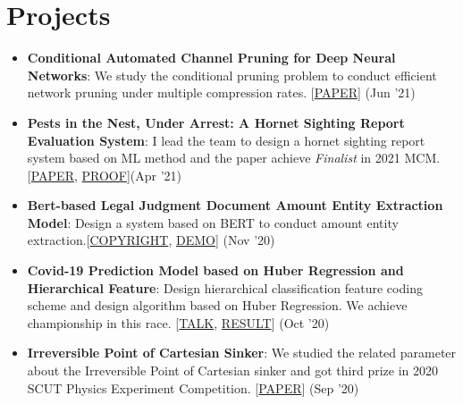 \documentclass[a4paper,20pt]{article}
\newcommand{\resumeItem}[2]{
  \item\small{
    \textbf{#1}{: #2 \vspace{-2pt}}
  }
}
\newcommand{\resumeSubItem}[2]{\resumeItem{#1}{#2}\vspace{-3pt}}
\newcommand{\resumeSubHeadingListStart}{\begin{itemize}[leftmargin=*]}
\newcommand{\resumeSubHeadingListEnd}{\end{itemize}}
\begin{document}
\section{Projects}
\resumeSubHeadingListStart
\resumeSubItem{Conditional Automated Channel Pruning for Deep Neural Networks}{We study the conditional pruning problem to conduct efficient network pruning under multiple compression rates. [\href{https://ieeexplore.ieee.org/document/9453104}{PAPER}] (Jun '21)}
\resumeSubItem{Pests in the Nest, Under Arrest:
A Hornet Sighting Report Evaluation System}{I lead the team to design a hornet sighting report system based on ML method and the paper achieve \textit{Finalist} in 2021 MCM. [\href{https://www.csyixinliu.com/project/2021mcm/finalist_paper.pdf}{PAPER}, \href{https://www.csyixinliu.com/materials/2021mcm_f.pdf}{PROOF}](Apr '21)}
\vspace{2pt}
\resumeSubItem{Bert-based Legal Judgment Document Amount Entity Extraction Model}{Design a system based on BERT to conduct amount entity extraction.[\href{https://www.csyixinliu.com/materials/software_copyright_money.pdf}{COPYRIGHT}, \href{http://47.119.188.215:7080/money_tool}{DEMO}]
(Nov '20)}
\vspace{2pt}
\resumeSubItem{Covid-19 Prediction Model based on Huber Regression and Hierarchical Feature}{Design hierarchical classification feature coding scheme and design algorithm based on Huber Regression. We achieve championship in this race. [\href{https://www.bilibili.com/video/BV185411574p?p=52}{TALK}, \href{http://www.cips-chip.org.cn/2020/eval_result}{RESULT}] (Oct '20)}
\vspace{2pt}
\resumeSubItem{Irreversible Point of Cartesian Sinker}{We studied the related parameter about the Irreversible Point of Cartesian sinker and got third prize in 2020 SCUT Physics Experiment Competition. [\href{https://www.csyixinliu.com/materials/phy-2020.pdf}{PAPER}] (Sep '20)}

\resumeSubHeadingListEnd
\end{document}
